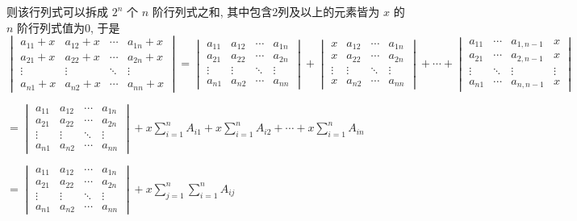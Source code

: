 		则该行列式可以拆成 \( 2^{n} \) 个 \( n \) 阶行列式之和, 其中包含2列及以上的元素皆为 \( x \) 的 \( n \) 阶行列式值为0, 于是
		\[ \begin{vmatrix}
				a_{11}+x & a_{12}+x & \cdots & a_{1n}+x \\
				a_{21}+x & a_{22}+x & \cdots & a_{2n}+x \\
				\vdots   & \vdots   & \ddots & \vdots   \\
				a_{n1}+x & a_{n2}+x & \cdots & a_{nn}+x
			\end{vmatrix} = \begin{vmatrix}
				a_{11} & a_{12} & \cdots & a_{1n} \\
				a_{21} & a_{22} & \cdots & a_{2n} \\
				\vdots & \vdots & \ddots & \vdots \\
				a_{n1} & a_{n2} & \cdots & a_{nn}
			\end{vmatrix} + \begin{vmatrix}
				x      & a_{12} & \cdots & a_{1n} \\
				x      & a_{22} & \cdots & a_{2n} \\
				\vdots & \vdots & \ddots & \vdots \\
				x      & a_{n2} & \cdots & a_{nn}
			\end{vmatrix} + \cdots + \begin{vmatrix}
				a_{11} & \cdots & a_{1,n-1} & x      \\
				a_{21} & \cdots & a_{2,n-1} & x      \\
				\vdots & \ddots & \vdots    & \vdots \\
				a_{n1} & \cdots & a_{n,n-1} & x
			\end{vmatrix} \]

		\( = \begin{vmatrix}
			a_{11} & a_{12} & \cdots & a_{1n} \\
			a_{21} & a_{22} & \cdots & a_{2n} \\
			\vdots & \vdots & \ddots & \vdots \\
			a_{n1} & a_{n2} & \cdots & a_{nn}
		\end{vmatrix} + x\sum_{i=1}^{n}A_{i1} + x\sum_{i=1}^{n}A_{i2} + \cdots + x\sum_{i=1}^{n}A_{in} \)

		\( = \begin{vmatrix}
			a_{11} & a_{12} & \cdots & a_{1n} \\
			a_{21} & a_{22} & \cdots & a_{2n} \\
			\vdots & \vdots & \ddots & \vdots \\
			a_{n1} & a_{n2} & \cdots & a_{nn}
		\end{vmatrix} + x\sum_{j=1}^{n}\sum_{i=1}^{n}A_{ij} \)

